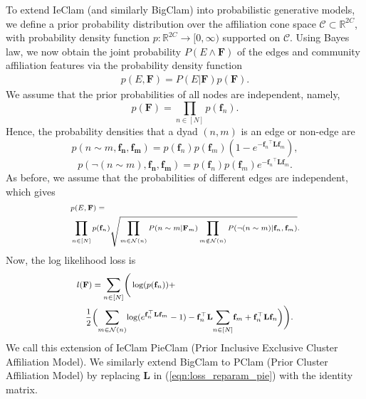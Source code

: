 \documentclass[letterpaper]{article} %
\newcommand{\sumgraph}{\underset{n \in [N]}{\sum}}
\def \sumgraphu {\underset{n\in [N]}{ \sum}}
\def \sumneighbors {\underset {m\in{\mathcal{N}(n)}}{\sum}}
\newcommand{\flf}{\mathbf{f}_n^\top   \mathbf{L} \mathbf{f}_m}
\begin{document}
To extend IeClam (and similarly BigClam) into probabilistic generative models, we define a prior probability distribution over the affiliation cone space $\mathcal{C}\subset \mathbb{R}^{2C}$, with probability density function $p:\mathbb{R}^{2C}\rightarrow [0,\infty)$ supported on $\mathcal{C}$. Using Bayes law, we now obtain the joint probability $P(E \wedge \mathbf{F})$ of the edges and community affiliation features  via the probability density function
\begin{align*}
    p(E ,\mathbf{F}) = P(E|\mathbf{F}) p(\mathbf{F}).
\end{align*}
We assume that the prior probabilities of all nodes are independent, namely,  
\[p(\mathbf{F}) = \underset{n\in [N]}{\prod} p(\mathbf{f}_n).\]
 Hence, the probability densities that a dyad $(n,m)$ is an edge or non-edge are
\[p(n\sim m, \mathbf{f_n}, \mathbf{f_m}) = p(\mathbf{f}_n)p(\mathbf{f}_m)(1 - e^{-{\mathbf{f}_n}^\top  \mathbf{L} {\mathbf{f}_m}}),\]
\[p(\neg(n\sim m), \mathbf{f_n}, \mathbf{f_m}) = p(\mathbf{f}_n)p(\mathbf{f}_m)e^{-{\mathbf{f}_n}^\top  \mathbf{L} {\mathbf{f}_m}}.\]
As before, we assume that the probabilities of different edges are independent, which gives
\begin{equation}
\scriptsize
\begin{aligned}
\label{eqn:likelihood_prior}
    &p(E, \mathbf{F}) =  \\ &\prod_{n \in [N]} p(\mathbf{f}_n)
        \sqrt{\prod_{m \in \mathcal{N}(n)}P(n\sim m|\mathbf{F}_m)\prod_{m \notin \mathcal{N}(n)}{P(\neg(n\sim m)|\mathbf{f}_n, \mathbf{f}_m)}
        }. 
 \end{aligned}
 \end{equation}
Now, the log likelihood loss is
\begingroup
\begin{equation}
\footnotesize
\begin{aligned}
\label{eqn:loss_reparam_pie}
   &  l(\mathbf{F})= \sumgraphu \Bigg(\log(p(\mathbf{f}_n)) + \\
   & \quad  \frac{1}{2} \Big(\sumneighbors{\log(e^{\flf} - 1)}  -  \mathbf{f}_n^\top  \mathbf{L}{\sumgraph{\mathbf{f}_m}} + \mathbf{f}_n^\top  \mathbf{L}\mathbf{f}_n \Big) \Bigg).
\end{aligned}
\end{equation}
\endgroup
We call this extension of IeClam PieClam (Prior Inclusive Exclusive Cluster Affiliation Model). We similarly extend BigClam to PClam (Prior Cluster Affiliation Model) by replacing $\mathbf{L}$ in (\ref{eqn:loss_reparam_pie}) with the identity matrix. 
\end{document}
